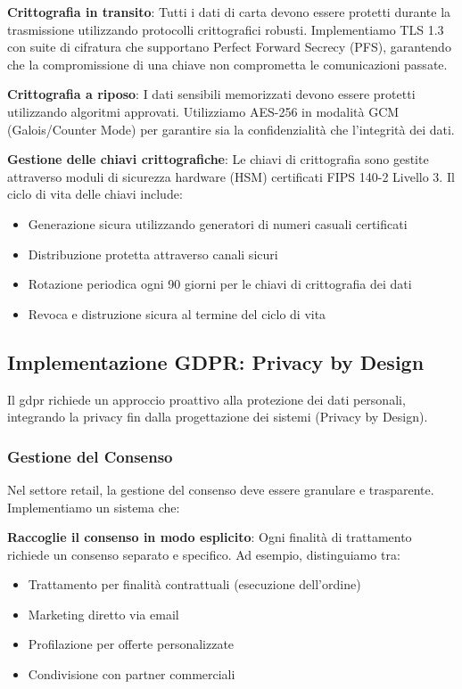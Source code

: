 \textbf{Crittografia in transito}: Tutti i dati di carta devono essere protetti durante la trasmissione utilizzando protocolli crittografici robusti. Implementiamo TLS 1.3 con suite di cifratura che supportano Perfect Forward Secrecy (PFS), garantendo che la compromissione di una chiave non comprometta le comunicazioni passate.

\textbf{Crittografia a riposo}: I dati sensibili memorizzati devono essere protetti utilizzando algoritmi approvati. Utilizziamo AES-256 in modalità GCM (Galois/Counter Mode) per garantire sia la confidenzialità che l'integrità dei dati.

\textbf{Gestione delle chiavi crittografiche}: Le chiavi di crittografia sono gestite attraverso moduli di sicurezza hardware (HSM) certificati FIPS 140-2 Livello 3. Il ciclo di vita delle chiavi include:
\begin{itemize}
    \item Generazione sicura utilizzando generatori di numeri casuali certificati
    \item Distribuzione protetta attraverso canali sicuri
    \item Rotazione periodica ogni 90 giorni per le chiavi di crittografia dei dati
    \item Revoca e distruzione sicura al termine del ciclo di vita
\end{itemize}

\subsection{Implementazione GDPR: Privacy by Design}
\label{subsec:4.4.2_gdpr}

Il \gls{gdpr} richiede un approccio proattivo alla protezione dei dati personali, integrando la privacy fin dalla progettazione dei sistemi (Privacy by Design).

\subsubsection{Gestione del Consenso}

Nel settore retail, la gestione del consenso deve essere granulare e trasparente. Implementiamo un sistema che:

\textbf{Raccoglie il consenso in modo esplicito}: Ogni finalità di trattamento richiede un consenso separato e specifico. Ad esempio, distinguiamo tra:
\begin{itemize}
    \item Trattamento per finalità contrattuali (esecuzione dell'ordine)
    \item Marketing diretto via email
    \item Profilazione per offerte personalizzate
    \item Condivisione con partner commerciali
\end{itemize}

